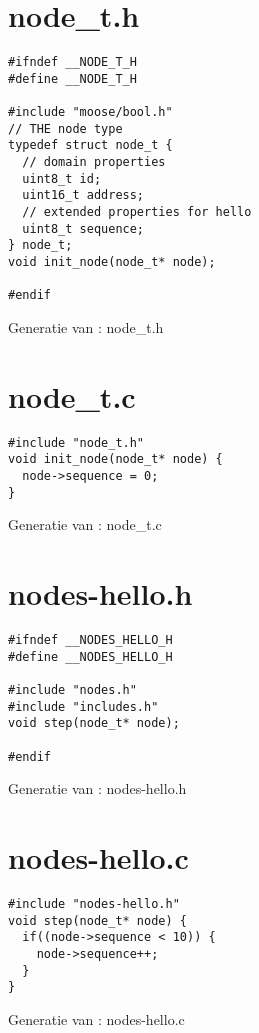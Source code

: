 \section{node\_t.h}
\vspace{-5mm}
\begin{listing}[H]
  \begin{verbatim}
#ifndef __NODE_T_H
#define __NODE_T_H

#include "moose/bool.h"
// THE node type
typedef struct node_t {
  // domain properties
  uint8_t id;
  uint16_t address;
  // extended properties for hello
  uint8_t sequence;
} node_t;
void init_node(node_t* node);

#endif
  \end{verbatim}
  \vspace{-5mm}
  \caption{Generatie van : node\_t.h}
\end{listing}

\section{node\_t.c}
\vspace{-5mm}
\begin{listing}[H]
  \begin{verbatim}
#include "node_t.h"
void init_node(node_t* node) {
  node->sequence = 0;
}
  \end{verbatim}
  \vspace{-5mm}
  \caption{Generatie van : node\_t.c}
\end{listing}

\section{nodes-hello.h}
\vspace{-5mm}
\begin{listing}[H]
  \begin{verbatim}
#ifndef __NODES_HELLO_H
#define __NODES_HELLO_H

#include "nodes.h"
#include "includes.h"
void step(node_t* node);

#endif
  \end{verbatim}
  \vspace{-5mm}
  \caption{Generatie van : nodes-hello.h}
\end{listing}

\section{nodes-hello.c}
\vspace{-5mm}
\begin{listing}[H]
  \begin{verbatim}
#include "nodes-hello.h"
void step(node_t* node) {
  if((node->sequence < 10)) {
    node->sequence++;
  }
}
  \end{verbatim}
  \vspace{-5mm}
  \caption{Generatie van : nodes-hello.c}
\end{listing}
